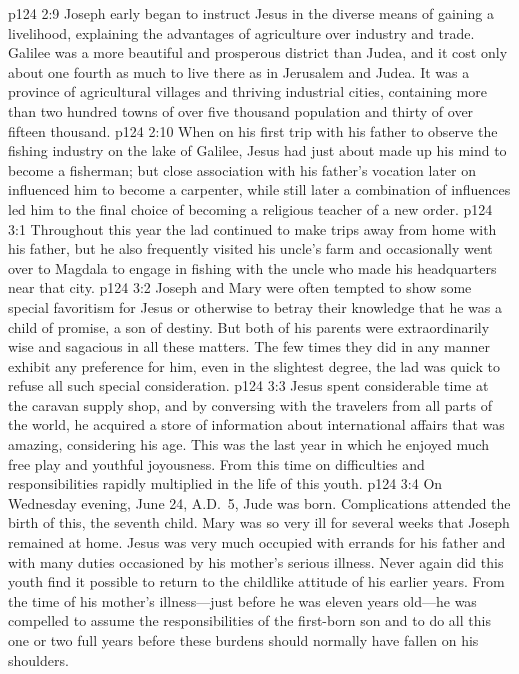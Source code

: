 \vs p124 2:9 Joseph early began to instruct Jesus in the diverse means of gaining a livelihood, explaining the advantages of agriculture over industry and trade. Galilee was a more beautiful and prosperous district than Judea, and it cost only about one fourth as much to live there as in Jerusalem and Judea. It was a province of agricultural villages and thriving industrial cities, containing more than two hundred towns of over five thousand population and thirty of over fifteen thousand.
\vs p124 2:10 When on his first trip with his father to observe the fishing industry on the lake of Galilee, Jesus had just about made up his mind to become a fisherman; but close association with his father’s vocation later on influenced him to become a carpenter, while still later a combination of influences led him to the final choice of becoming a religious teacher of a new order.
\vs p124 3:1 Throughout this year the lad continued to make trips away from home with his father, but he also frequently visited his uncle’s farm and occasionally went over to Magdala to engage in fishing with the uncle who made his headquarters near that city.
\vs p124 3:2 Joseph and Mary were often tempted to show some special favoritism for Jesus or otherwise to betray their knowledge that he was a child of promise, a son of destiny. But both of his parents were extraordinarily wise and sagacious in all these matters. The few times they did in any manner exhibit any preference for him, even in the slightest degree, the lad was quick to refuse all such special consideration.
\vs p124 3:3 Jesus spent considerable time at the caravan supply shop, and by conversing with the travelers from all parts of the world, he acquired a store of information about international affairs that was amazing, considering his age. This was the last year in which he enjoyed much free play and youthful joyousness. From this time on difficulties and responsibilities rapidly multiplied in the life of this youth.
\pc \vs p124 3:4 On Wednesday evening, June 24, A.D.~5, Jude was born. Complications attended the birth of this, the seventh child. Mary was so very ill for several weeks that Joseph remained at home. Jesus was very much occupied with errands for his father and with many duties occasioned by his mother’s serious illness. Never again did this youth find it possible to return to the childlike attitude of his earlier years. From the time of his mother’s illness---just before he was eleven years old---he was compelled to assume the responsibilities of the first\hyp{}born son and to do all this one or two full years before these burdens should normally have fallen on his shoulders.
